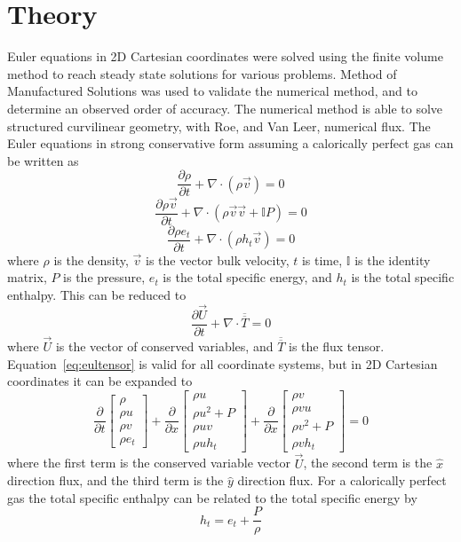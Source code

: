 \documentclass[]{aiaa-tc}%
\newcommand{\pderiv}[2]{\frac{\partial #1}{\partial #2}}
\newcommand*{\rttensor}[1]{\overline{\overline{#1}}}
\begin{document}
\section{Theory}

Euler equations in 2D Cartesian coordinates were solved using the finite volume method to reach steady state solutions for various problems. Method of Manufactured Solutions was used to validate the numerical method, and to determine an observed order of accuracy. The numerical method is able to solve structured curvilinear geometry, with Roe, and Van Leer, numerical flux. The Euler equations in strong conservative form assuming a calorically perfect gas can be written as
\begin{equation}\label{eq:eulrho}
  \pderiv{\rho}{t} + \nabla\cdot(\rho \vec{v}) = 0
\end{equation}
\begin{equation}\label{eq:eulmtm}
  \pderiv{\rho \vec{v}}{t} + \nabla\cdot(\rho \vec{v}\vec{v} + \mathbb{I} P) = 0
\end{equation}
\begin{equation}\label{eq:eulenergy}
  \pderiv{\rho e_t}{t} + \nabla\cdot(\rho h_t \vec{v}) = 0
\end{equation}
where $\rho$ is the density, $\vec{v}$ is the vector bulk velocity, $t$ is time, $\mathbb{I}$ is the identity matrix, $P$ is the pressure, $e_t$ is the total specific energy, and $h_t$ is the total specific enthalpy. This can be reduced to 
\begin{equation}\label{eq:eultensor}
  \pderiv{\vec{U}}{t} + \nabla\cdot\rttensor{T} = 0
\end{equation}
where $\vec{U}$ is the vector of conserved variables, and $\rttensor{T}$ is the flux tensor. Equation~\ref{eq:eultensor} is valid for all coordinate systems, but in 2D Cartesian coordinates it can be expanded to
\[
  \pderiv{}{t}
  \begin{bmatrix}
    \rho \\
    \rho u \\
    \rho v \\
    \rho e_t
  \end{bmatrix}
  + \pderiv{}{x}
  \begin{bmatrix}
    \rho u \\
    \rho u^2 + P \\
    \rho u v \\
    \rho u h_t
  \end{bmatrix}
  + \pderiv{}{x}
  \begin{bmatrix}
    \rho v \\
    \rho v u \\
    \rho v^2 + P \\
    \rho v h_t
  \end{bmatrix}
  =0
\]
where the first term is the conserved variable vector $\vec{U}$, the second term is the $\hat{x}$ direction flux, and the third term is the $\hat{y}$ direction flux. For a calorically perfect gas the total specific enthalpy can be related to the total specific energy by
\begin{equation} \label{eq:idealgas}
  h_t = e_t + \frac{P}{\rho}
\end{equation}
\end{document}
